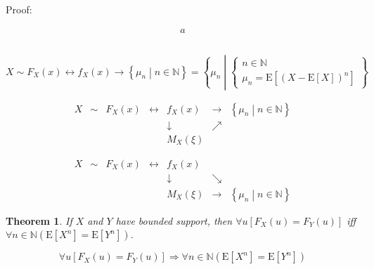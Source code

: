 \documentclass[
]{book}
\newtheorem{theorem}{Theorem}[chapter]
\theoremstyle{definition}
\theoremstyle{definition}
\theoremstyle{definition}
\theoremstyle{definition}
\theoremstyle{remark}
\begin{document}
Proof:

\[
\begin{aligned}
a
\end{aligned}
\]

\[
\tag*{$\Box$}
\]

\[
X\sim F_{{\scriptscriptstyle X}}\left(x\right)\leftrightarrow f_{{\scriptscriptstyle X}}\left(x\right)\rightarrow\left\{ \mu_{{\scriptscriptstyle n}}\middle|n\in\mathbb{N}\right\} =\left\{ \mu_{{\scriptscriptstyle n}}\middle|\begin{cases}
n\in\mathbb{N}\\
\mu_{{\scriptscriptstyle n}}=\mathrm{E}\left[\left(X-\mathrm{E}\left[X\right]\right)^{n}\right]
\end{cases}\right\} 
\]

\[
\begin{array}{ccccccc}
X & \sim & F_{{\scriptscriptstyle X}}\left(x\right) & \leftrightarrow & f_{{\scriptscriptstyle X}}\left(x\right) & \rightarrow & \left\{ \mu_{{\scriptscriptstyle n}}\middle|n\in\mathbb{N}\right\} \\
 &  &  &  & \downarrow & \nearrow\\
 &  &  &  & M_{{\scriptscriptstyle X}}\left(\xi\right)
\end{array}
\]

\[
\begin{array}{ccccccc}
X & \sim & F_{{\scriptscriptstyle X}}\left(x\right) & \leftrightarrow & f_{{\scriptscriptstyle X}}\left(x\right)\\
 &  &  &  & \downarrow & \searrow\\
 &  &  &  & M_{{\scriptscriptstyle X}}\left(\xi\right) & \rightarrow & \left\{ \mu_{{\scriptscriptstyle n}}\middle|n\in\mathbb{N}\right\} 
\end{array}
\]

\begin{theorem}
\protect\hypertarget{thm:unnamed-chunk-28}{}\label{thm:unnamed-chunk-28}If \(X\) and \(Y\) have bounded support, then \(\forall u\left[F_{{\scriptscriptstyle X}}\left(u\right)=F_{{\scriptscriptstyle Y}}\left(u\right)\right]\) iff \(\forall n\in\mathbb{N}\left(\mathrm{E}\left[X^{n}\right]=\mathrm{E}\left[Y^{n}\right]\right)\).
\end{theorem}

\[
\forall u\left[F_{{\scriptscriptstyle X}}\left(u\right)=F_{{\scriptscriptstyle Y}}\left(u\right)\right]\Rightarrow\forall n\in\mathbb{N}\left(\mathrm{E}\left[X^{n}\right]=\mathrm{E}\left[Y^{n}\right]\right)
\]
\end{document}
